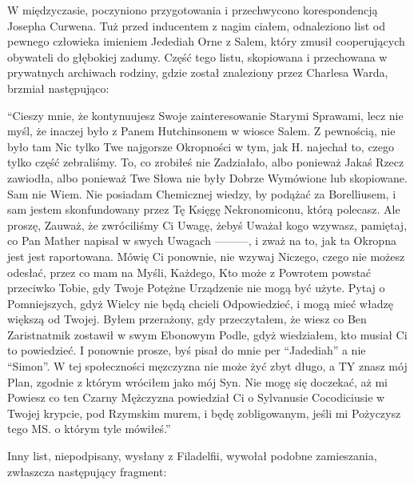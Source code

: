 W międzyczasie, poczyniono przygotowania i przechwycono korespondencją Josepha Curwena. Tuż przed inducentem z nagim ciałem, odnaleziono list od pewnego człowieka imieniem Jedediah Orne z Salem, który zmusił cooperujących obywateli do głębokiej zadumy. Część tego listu, skopiowana i przechowana w prywatnych archiwach rodziny, gdzie został znaleziony przez Charlesa Warda, brzmiał następująco: 

\begin{displayquote}

``Cieszy mnie, że kontynuujesz Swoje zainteresowanie Starymi Sprawami, lecz nie myśl, że inaczej było z Panem Hutchinsonem w wiosce Salem. Z pewnością, nie było tam Nic tylko Twe najgorsze Okropności w tym, jak H. najechał to, czego tylko część zebraliśmy. To, co zrobiłeś nie Zadziałało, albo ponieważ Jakaś Rzecz zawiodła, albo ponieważ Twe Słowa nie były Dobrze Wymówione lub skopiowane. Sam nie Wiem. Nie posiadam Chemicznej wiedzy, by podążać za Borelliusem, i sam jestem skonfundowany przez Tę Księgę Nekronomiconu, którą polecasz. Ale proszę, Zauważ, że zwróciliśmy Ci Uwagę, żebyś Uważał kogo wzywasz, pamiętaj, co Pan Mather napisał w swych Uwagach ———, i zważ na to, jak ta Okropna jest jest raportowana. Mówię Ci ponownie, nie wzywaj Niczego, czego nie możesz odesłać, przez co mam na Myśli, Każdego, Kto może z Powrotem powstać przeciwko Tobie, gdy Twoje Potężne Urządzenie nie mogą być użyte. Pytaj o Pomniejszych, gdyż Wielcy nie będą chcieli Odpowiedzieć, i mogą mieć władzę większą od Twojej. Byłem przerażony, gdy przeczytałem, że wiesz co Ben Zaristnatmik zostawił w swym Ebonowym Podle, gdyż wiedziałem, kto musiał Ci to powiedzieć. I ponownie prosze, byś pisał do mnie per ``Jadediah'' a nie ``Simon''. W tej społeczności męzczyzna nie może żyć zbyt długo, a TY znasz mój Plan, zgodnie z którym wróciłem jako mój Syn. Nie mogę się doczekać, aż mi Powiesz co ten Czarny Mężczyzna powiedział Ci o Sylvanusie Cocodiciusie w Twojej krypcie, pod Rzymskim murem, i będę zobligowanym, jeśli mi Pożyczysz tego MS. o którym tyle mówiłeś.''

\end{displayquote}

Inny list, niepodpisany, wysłany z Filadelfii, wywołał podobne zamieszania, zwłaszcza następujący fragment:

